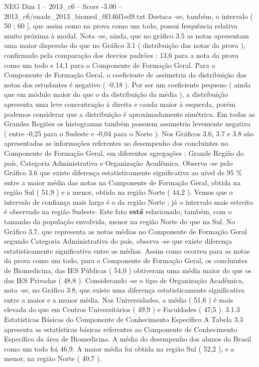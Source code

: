 \begin{textsample}{NEG Dim 1 – 2013\_c6 – Score -3.00 – 2013\_c6/enade\_2013\_biomed\_0f146f1ed9.txt}
Destaca -se, também, o intervalo ( 50 ; 60 ], que assim como na prova como um todo, possui frequência relativa muito próxima à modal.
Nota -se, ainda, que no gráfico 3.5 as notas apresentam uma maior dispersão do que no Gráfico 3.1 ( distribuição das notas da prova ), confirmado pela comparação dos desvios padrões : 13,6 para a nota da prova como um todo e 14,1 para o Componente de Formação Geral.
Para o Componente de Formação Geral, o coeficiente de assimetria da distribuição das notas dos estudantes é negativo ( -0,18 ).
Por ser um coeficiente pequeno ( ainda que em módulo maior do que o da distribuição da média ), a distribuição apresenta uma leve concentração à direita e cauda maior à esquerda, porém podemos considerar que a distribuição é aproximadamente simétrica.
Em todas as Grandes Regiões os histogramas também possuem assimetria levemente negativa ( entre -0,25 para o Sudeste e -0,04 para o Norte ).
Nos Gráficos 3.6, 3.7 e 3.8 são apresentadas as informações referentes ao desempenho dos concluintes no Componente de Formação Geral, em diferentes agregações : Grande Região do país, Categoria Administrativa e Organização Acadêmica.
Observa -se pelo Gráfico 3.6 que existe diferença estatisticamente significativa ao nível de 95 \% entre a maior média das notas na Componente de Formação Geral, obtida na região Sul ( 51,9 ) e a menor, obtida na região Norte ( 44,2 ).
Vemos que o intervalo de confiança mais largo é o da região Norte ; já o intervalo mais estreito é observado na região Sudeste.
Este fato \textbf{está} relacionado, também, com o tamanho da população envolvida, menor na região Norte do que na Sul.
No Gráfico 3.7, que representa as notas médias no Componente de Formação Geral segundo Categoria Administrativa do país, observa -se que existe diferença estatisticamente significativa entre as médias.
Assim como ocorreu para as notas da prova como um todo, para o Componente de Formação Geral, os concluintes de Biomedicina, das IES Públicas ( 54,0 ) obtiveram uma média maior do que os das IES Privadas ( 48,8 ).
Considerando -se o tipo de Organização Acadêmica, nota -se, no Gráfico 3.8, que existe uma diferença estatisticamente significativa entre a maior e a menor média.
Nas Universidades, a média ( 51,6 ) é mais elevada do que em Centros Universitários ( 49,9 ) e Faculdades ( 47,5 ). 3.1.3 Estatísticas Básicas do Componente de Conhecimento Específico A Tabela 3.3 apresenta as estatísticas básicas referentes ao Componente de Conhecimento Específico da área de Biomedicina.
A média do desempenho dos alunos do Brasil como um todo foi 46,9.
A maior média foi obtida na região Sul ( 52,2 ), e a menor, na região Norte ( 40,7 ).

\end{textsample}
